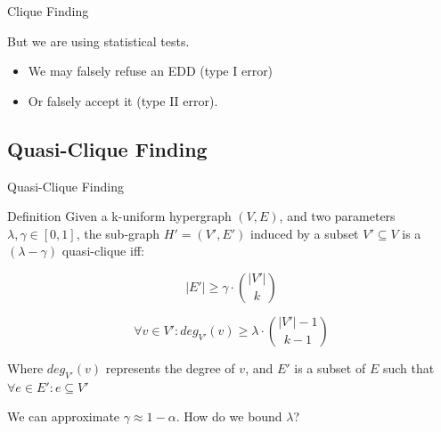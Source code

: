 \documentclass[10pt,notes]{beamer}
\begin{document}
\begin{frame}{Clique Finding}
    \pause
    
    \begin{alertblock}{}
    But we are using statistical tests.
    
    \begin{itemize}
        \item We may falsely refuse an EDD (type I error)
        \item Or falsely accept it (type II error).
    \end{itemize}
    \end{alertblock}
\end{frame}


\subsection{Quasi-Clique Finding}
\begin{frame}{Quasi-Clique Finding}
    \begin{alertblock}{Definition}
    Given a k-uniform hypergraph $(V,E)$, and two parameters $\lambda, \gamma \in [0,1]$,
    the sub-graph $H'=(V',E')$ induced by a subset $V' \subseteq V$ is a
    $(\lambda-\gamma)$ quasi-clique iff:
    
    \begin{equation}
        |E'| \ge \gamma \cdot \binom{|V'|}{k}
        \label{eq:edge_hyperclique}
    \end{equation}
    
    \begin{equation}
        \forall v \in V': deg_{V'}(v) \ge \lambda \cdot \binom{|V'| - 1}{k - 1}
        \label{eq:deg_hyperclique}
    \end{equation}

    Where $deg_{V'}(v)$ represents the degree of $v$, and $E'$ is a subset of $E$ such that
    $\forall e \in E' : e \subseteq V'$
    \end{alertblock}
    
    We can approximate $\gamma \approx 1 - \alpha$. How do we bound $\lambda$?

\end{frame}
\end{document}
